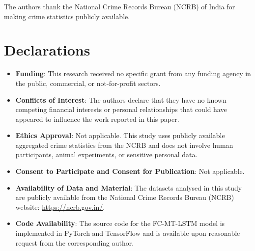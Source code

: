 \documentclass{svproc}
\newcommand{\modelname}{FC-MT-LSTM}
\begin{document}
The authors thank the National Crime Records Bureau (NCRB) of India for making crime statistics publicly available.

\section*{Declarations}

\begin{itemize}
\item \textbf{Funding}: This research received no specific grant from any funding agency in the public, commercial, or not-for-profit sectors.
\item \textbf{Conflicts of Interest}: The authors declare that they have no known competing financial interests or personal relationships that could have appeared to influence the work reported in this paper.
\item \textbf{Ethics Approval}: Not applicable. This study uses publicly available aggregated crime statistics from the NCRB and does not involve human participants, animal experiments, or sensitive personal data.
\item \textbf{Consent to Participate and Consent for Publication}: Not applicable.
\item \textbf{Availability of Data and Material}: The datasets analysed in this study are publicly available from the National Crime Records Bureau (NCRB) website: \url{https://ncrb.gov.in/}.
\item \textbf{Code Availability}: The source code for the \modelname{} model is implemented in PyTorch and TensorFlow and is available upon reasonable request from the corresponding author.
\end{itemize}
\end{document}
